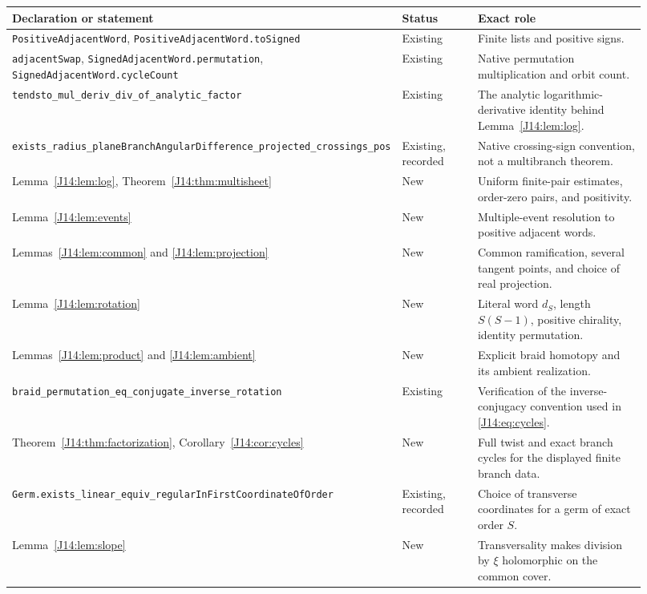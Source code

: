 \documentclass[11pt,oneside]{report}
\theoremstyle{definition}
\numberwithin{equation}{section}
\newcommand{\decl}[1]{\textnormal{\nolinkurl{#1}}}
\begin{document}
\small
\begin{longtable}{>{\raggedright\arraybackslash}p{0.43\linewidth}
                  >{\raggedright\arraybackslash}p{0.15\linewidth}
                  >{\raggedright\arraybackslash}p{0.34\linewidth}}
Declaration or statement & Status & Exact role\\\hline\endhead
\decl{PositiveAdjacentWord}, \decl{PositiveAdjacentWord.toSigned}
& Existing & Finite lists and positive signs.\\
\decl{adjacentSwap}, \decl{SignedAdjacentWord.permutation},
\decl{SignedAdjacentWord.cycleCount}
& Existing & Native permutation multiplication and orbit count.\\
\decl{tendsto_mul_deriv_div_of_analytic_factor}
& Existing & The analytic logarithmic-derivative identity behind Lemma~\ref{J14:lem:log}.\\
\decl{exists_radius_planeBranchAngularDifference_projected_crossings_pos}
& Existing, recorded & Native crossing-sign convention, not a multibranch theorem.\\
Lemma~\ref{J14:lem:log}, Theorem~\ref{J14:thm:multisheet}
& New & Uniform finite-pair estimates, order-zero pairs, and positivity.\\
Lemma~\ref{J14:lem:events}
& New & Multiple-event resolution to positive adjacent words.\\
Lemmas~\ref{J14:lem:common} and \ref{J14:lem:projection}
& New & Common ramification, several tangent points, and choice of real projection.\\
Lemma~\ref{J14:lem:rotation}
& New & Literal word $d_S$, length $S(S-1)$, positive chirality, identity permutation.\\
Lemmas~\ref{J14:lem:product} and \ref{J14:lem:ambient}
& New & Explicit braid homotopy and its ambient realization.\\
\decl{braid_permutation_eq_conjugate_inverse_rotation}
& Existing & Verification of the inverse-conjugacy convention used in \eqref{J14:eq:cycles}.\\
Theorem~\ref{J14:thm:factorization}, Corollary~\ref{J14:cor:cycles}
& New & Full twist and exact branch cycles for the displayed finite branch data.\\
\decl{Germ.exists_linear_equiv_regularInFirstCoordinateOfOrder}
& Existing, recorded & Choice of transverse coordinates for a germ of exact order $S$.\\
Lemma~\ref{J14:lem:slope}
& New & Transversality makes division by $\xi$ holomorphic on the common cover.\\

\end{longtable}
\end{document}
